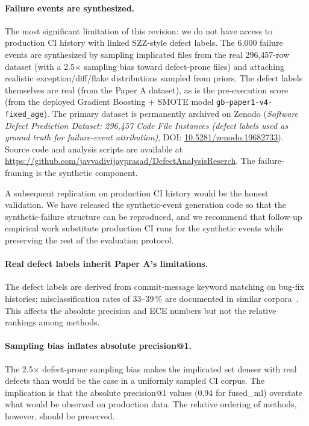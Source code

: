 \documentclass[10pt,twocolumn,letterpaper]{article}
\begin{document}
\paragraph{Failure events are synthesized.} The most significant
limitation of this revision: we do not have access to production CI
history with linked SZZ-style defect labels. The 6{,}000 failure
events are synthesized by sampling implicated files from the real
296{,}457-row dataset (with a 2.5$\times$ sampling bias toward
defect-prone files) and attaching realistic exception/diff/flake
distributions sampled from priors. The defect labels themselves are
real (from the Paper A dataset), as is the pre-execution score
(from the deployed Gradient Boosting + SMOTE model
\texttt{gb-paper1-v4-fixed\_age}). The primary dataset is permanently archived on Zenodo (\textit{Software Defect Prediction Dataset: 296,457 Code File Instances (defect labels used as ground truth for failure-event attribution)}, DOI: \href{https://doi.org/10.5281/zenodo.19682733}{10.5281/zenodo.19682733}). Source code and analysis scripts are available at \url{https://github.com/javvadivijayprasad/DefectAnalysisReserch}. The failure-framing is the
synthetic component.

A subsequent replication on production CI history would be the
honest validation. We have released the synthetic-event generation
code so that the synthetic-failure structure can be reproduced, and
we recommend that follow-up empirical work substitute production CI
runs for the synthetic events while preserving the rest of the
evaluation protocol.

\paragraph{Real defect labels inherit Paper A's limitations.} The
defect labels are derived from commit-message keyword matching on
bug-fix histories; misclassification rates of 33--39\,\% are
documented in similar
corpora~\citep{bird2009,herzig2013}. This affects the absolute
precision and ECE numbers but not the relative rankings among
methods.

\paragraph{Sampling bias inflates absolute precision@1.} The
2.5$\times$ defect-prone sampling bias makes the implicated set
denser with real defects than would be the case in a uniformly
sampled CI corpus. The implication is that the absolute precision@1 values (0.94 for fused\_ml) overstate what would be observed on
production data. The relative ordering of methods, however, should
be preserved.
\end{document}
